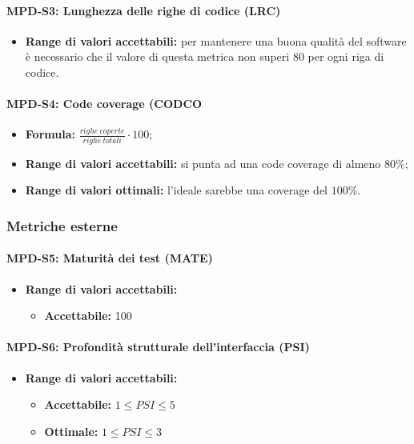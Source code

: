 \paragraph{MPD-S3: Lunghezza delle righe di codice (LRC)}
\begin{itemize}
    \item \textbf{Range di valori accettabili:} per mantenere una buona qualità del software è necessario che il valore di questa metrica non superi
          80 per ogni riga di codice.
\end{itemize}

\paragraph{MPD-S4: Code coverage (CODCO}
\begin{itemize}
    \item \textbf{Formula:} $\frac{righe \ coperte}{righe \ totali} \cdot 100$;
    \item \textbf{Range di valori accettabili:} si punta ad una code coverage di almeno $80\%$;
    \item \textbf{Range di valori ottimali:} l'ideale sarebbe una coverage del $100\%$.
\end{itemize}

\subsubsection{Metriche esterne}

\paragraph{MPD-S5: Maturità dei test (MATE)}
\begin{itemize}
    \item \textbf{Range di valori accettabili:}
          \begin{itemize}
              \item \textbf{Accettabile:} 100%
          \end{itemize}
\end{itemize}

\paragraph{MPD-S6: Profondità strutturale dell'interfaccia (PSI)}
\begin{itemize}
    \item \textbf{Range di valori accettabili:}
          \begin{itemize}
              \item \textbf{Accettabile:} $1 \leq PSI \leq 5$
              \item \textbf{Ottimale:} $1 \leq PSI \leq 3$
          \end{itemize}
\end{itemize}

